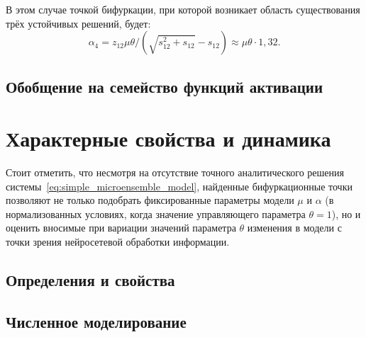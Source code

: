 В этом случае точкой бифуркации, при которой возникает область существования трёх устойчивых решений, будет: 
$$\alpha_{4} = z_{12} \mu \theta / (\sqrt{s_{12}^{2} + s_{12}} - s_{12}) \approx  \mu \theta \cdot 1,32.$$


\newpage
\subsection{Обобщение на семейство функций активации}  \label{subsection:analysis_custom}


\newpage
\section{Характерные свойства и динамика} \label{section:neuron_dynamic}

Стоит отметить, что несмотря на отсутствие точного аналитического решения системы~\eqref{eq:simple_microensemble_model}, найденные бифуркационные точки позволяют не только подобрать фиксированные параметры модели $\mu$ и $\alpha$ (в нормализованных условиях, когда значение управляющего параметра $\theta = 1$), но и оценить вносимые при вариации значений параметра $\theta$ изменения в модели с точки зрения нейросетевой обработки информации.

\subsection{Определения и свойства}


%
%


\subsection{Численное моделирование}


